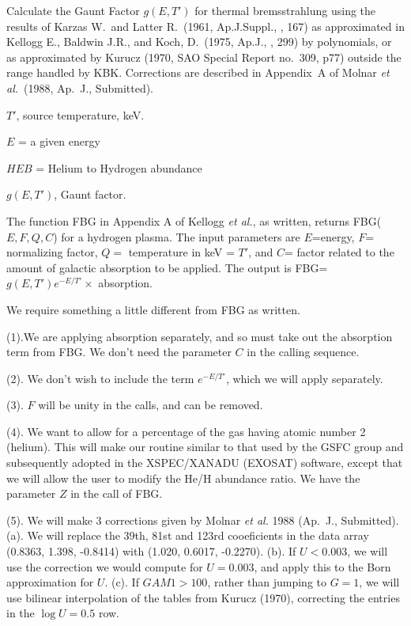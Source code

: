 {\listlist
 

Calculate the Gaunt Factor $g(E,T')$ for thermal bremsstrahlung
using the results of Karzas W.~and Latter R.~(1961, Ap.J.Suppl., 
,
167) as approximated in Kellogg E., Baldwin J.R., and Koch, D.~(1975,
Ap.J., , 299) by polynomials, or as approximated by
Kurucz (1970, SAO Special Report no.~309, p77) outside the range
handled by KBK.  Corrections are described in Appendix~A of Molnar
{\it et al.}~(1988, Ap.~J., Submitted).


$T'$, source temperature, keV.

$E$ = a given energy

$HEB$ = Helium to Hydrogen abundance


$g(E,T')$, Gaunt factor.


The function FBG in Appendix A of Kellogg {\it et al.}, as written,
returns FBG($E,F,Q,C$) for a hydrogen plasma.  The input parameters are
$E$=energy, $F$= normalizing factor, $Q=$ temperature in keV = $T'$,
and $C$= factor related to the amount of galactic absorption to be
applied.  The output is FBG=$g(E,T') e^{-E/T'} \times$ absorption.

We require something a little different from FBG as written.

(1).We are applying absorption separately, and so must take out the
absorption term from FBG.  We don't need the parameter $C$ in the
calling sequence.

(2). We don't wish to include the term $e^{-E/T'}$, which we will
apply separately.

(3). $F$ will be unity in the calls, and can be removed.

(4). We want to allow for a percentage of the gas having atomic
number 2 (helium).  This will make our routine similar to that used by
the GSFC group and subsequently adopted in the XSPEC/XANADU
(EXOSAT) software, except that we will allow the user to modify the
He/H abundance ratio. We have the parameter $Z$ in the call of FBG.

(5). We will make 3 corrections given by Molnar {\it et al.} 1988
(Ap.~J., Submitted).  (a). We will replace the 39th, 81st and 123rd cooeficients
in the data array (0.8363, 1.398, -0.8414) with (1.020, 0.6017,
-0.2270).
(b). If $U<0.003$, we will use the correction we would compute for
$U=0.003$, and apply this to the Born
approximation for $U$.
(c). If $GAM1 > 100$, rather than
jumping to $G=1$, we will use bilinear interpolation of the tables
from Kurucz (1970), correcting the entries in the $\log U = 0.5$ row.

}
